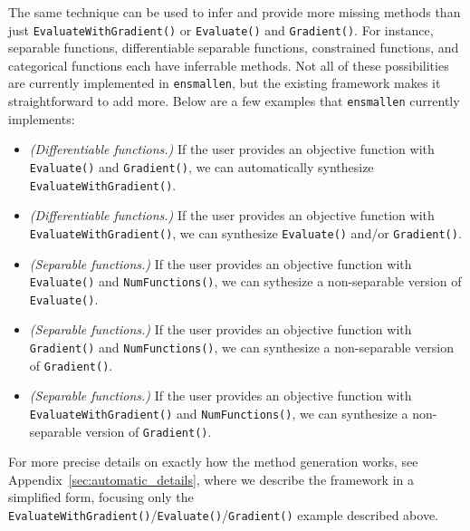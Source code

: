 The same technique can be used to infer and provide more missing methods than
just {\tt EvaluateWithGradient()} or {\tt Evaluate()} and {\tt Gradient()}.  
For instance, separable functions, differentiable separable functions, constrained
functions, and categorical functions each have inferrable methods.  Not all of
these possibilities are currently implemented in {\tt ensmallen}, but the
existing framework makes it straightforward to add more.  Below are a
few examples that {\tt ensmallen} currently implements:

\begin{itemize}
  \item {\it (Differentiable functions.)}  If the user provides an objective
function with {\tt Evaluate()} and {\tt Gradient()}, we can automatically
synthesize {\tt EvaluateWithGradient()}.

  \item {\it (Differentiable functions.)}  If the user provides an objective
function with {\tt EvaluateWithGradient()}, we can synthesize {\tt Evaluate()}
and/or {\tt Gradient()}.

  \item {\it (Separable functions.)}  If the user provides an objective
function with {\tt Evaluate()} and {\tt NumFunctions()}, we can sythesize a
non-separable version of {\tt Evaluate()}.

  \item {\it (Separable functions.)}  If the user provides an objective function
with {\tt Gradient()} and {\tt NumFunctions()}, we can synthesize a
non-separable version of {\tt Gradient()}.

  \item {\it (Separable functions.)}  If the user provides an objective
function with {\tt EvaluateWithGradient()} and {\tt NumFunctions()}, we can
synthesize a non-separable version of {\tt Gradient()}.
\end{itemize}

For more precise details on exactly how the method generation works,
see Appendix~\ref{sec:automatic_details},
where we describe the framework in a simplified form,
focusing only the {\tt EvaluateWithGradient()}/{\tt Evaluate()}/{\tt Gradient()}
example described above.
